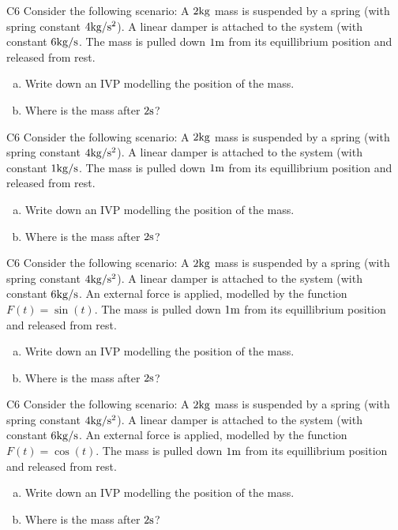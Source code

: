 \begin{problem}{C6}
Consider the following scenario:
A \(2 {\rm kg}\) mass is suspended by a spring (with spring constant \(4 {\rm kg /s^2}\)).  A linear damper is attached to the system (with constant \(6 {\rm kg/s}\).  The mass is pulled down \(1 {\rm m}\) from its equillibrium position and released from rest.  
\begin{enumerate}[(a)]
\item Write down an IVP modelling the position of the mass.
\item Where is the mass after \(2 {\rm s}\)?
\end{enumerate}
\end{problem}

\begin{problem}{C6}
Consider the following scenario:
A \(2 {\rm kg}\) mass is suspended by a spring (with spring constant \(4 {\rm kg /s^2}\)).  A linear damper is attached to the system (with constant \(1 {\rm kg/s}\).  The mass is pulled down \(1 {\rm m}\) from its equillibrium position and released from rest.  
\begin{enumerate}[(a)]
\item Write down an IVP modelling the position of the mass.
\item Where is the mass after \(2 {\rm s}\)?
\end{enumerate}
\end{problem}





\begin{problem}{C6}
Consider the following scenario:
A \(2 {\rm kg}\) mass is suspended by a spring (with spring constant \(4 {\rm kg /s^2}\)).  A linear damper is attached to the system (with constant \(6 {\rm kg/s}\).  An external force is applied, modelled by the function \(F(t)=\sin(t)\).  The mass is pulled down \(1 {\rm m}\) from its equillibrium position and released from rest.  
\begin{enumerate}[(a)]
\item Write down an IVP modelling the position of the mass.
\item Where is the mass after \(2 {\rm s}\)?
\end{enumerate}
\end{problem}

\begin{problem}{C6}
Consider the following scenario:
A \(2 {\rm kg}\) mass is suspended by a spring (with spring constant \(4 {\rm kg /s^2}\)).  A linear damper is attached to the system (with constant \(6 {\rm kg/s}\).  An external force is applied, modelled by the function \(F(t)=\cos(t)\).  The mass is pulled down \(1 {\rm m}\) from its equillibrium position and released from rest.  
\begin{enumerate}[(a)]
\item Write down an IVP modelling the position of the mass.
\item Where is the mass after \(2 {\rm s}\)?
\end{enumerate}
\end{problem}
